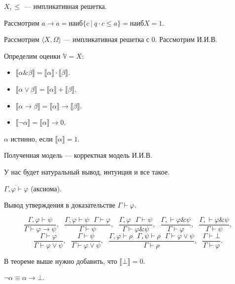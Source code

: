 \begin{theorem}
     $X, \leqslant$ --- импликативная решетка.
    
    Рассмотрим $a \to a= \text{наиб} \{ c ~|~ q \cdot c \leqslant a\} = \text{наиб} X = 1$.
\end{theorem}

\begin{theorem}
    Рассмотрим $\langle X, \Omega \rangle$ --- импликативная решетка с $0$. Рассмотрим И.И.В.


    Определим оценки $\mathbb{V}  = X$:
    \begin{itemize}
        \item     $\llbracket \alpha \& \beta \rrbracket = \llbracket\alpha \rrbracket \cdot \llbracket\beta \rrbracket$.
        \item     $\llbracket \alpha \vee \beta \rrbracket = \llbracket\alpha \rrbracket + \llbracket\beta \rrbracket$.
        \item     $\llbracket \alpha \to \beta \rrbracket = \llbracket\alpha \rrbracket \to \llbracket\beta \rrbracket$.
        \item     $\llbracket \neg \alpha \rrbracket = \llbracket\alpha \rrbracket \to 0$.
    \end{itemize}

    $\alpha$ истинно, если $\llbracket \alpha \rrbracket = 1$.

    Полученная модель --- корректная модель И.И.В.
\end{theorem}

У нас будет натуральный вывод, интуиция и все такое.

$\overline{\Gamma, \varphi \vdash \varphi}$ (аксиома).

Вывод утверждения в доказательстве $\Gamma \vdash \varphi$.

\[
    \dfrac{\Gamma, \varphi \vdash \psi}{\Gamma \vdash \varphi \to \psi},~~~
    \dfrac{\Gamma, \varphi \vdash \psi~~~ \Gamma \vdash \varphi}{\Gamma \vdash \psi},~~~
    \dfrac{\Gamma, \varphi ~~~ \Gamma \vdash \psi}{\Gamma \vdash \varphi \& \psi},~~~
    \dfrac{\Gamma, \vdash \varphi \& \psi}{\Gamma \vdash \varphi},~~~
    \dfrac{\Gamma, \vdash \varphi \& \psi}{\Gamma \vdash \psi},
\]\[
    \dfrac{\Gamma \vdash \varphi}{\Gamma\vdash\varphi \vee \psi},~~~
    \dfrac{\Gamma \vdash \psi}{\Gamma\vdash\varphi \vee \psi},~~~
    \dfrac{\Gamma, \varphi \vdash \rho~~~ \Gamma, \psi \vdash \rho~~~ \Gamma \vdash \varphi \vee \psi}{\Gamma\vdash\rho},~~~
    \dfrac{\Gamma \vdash \bot }{\Gamma\vdash\varphi}.
\]

В теореме выше нужно добавить, что $\llbracket\bot \rrbracket = 0$.

$\neg \alpha \equiv \alpha \to \bot$.

\endinput